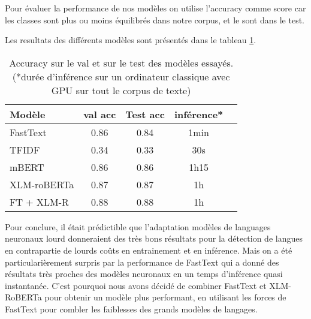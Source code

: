 
Pour évaluer la performance de nos modèles on utilise l'accuracy comme score car les classes sont plus ou moins équilibrés dans notre corpus, et le sont dans le test.

Les resultats des différents modèles sont présentés dans le tableau \ref{tab:results}.

\begin{table}[ht]
    \centering
    \begin{tabular}{lcccc}
        \toprule
        Modèle & val acc & Test acc  & inférence* \\
        \midrule
        FastText & 0.86 & 0.84 & 1min \\
        TFIDF & 0.34 & 0.33 & 30s \\
        mBERT & 0.86 & 0.86 & 1h15 \\
        XLM-roBERTa & 0.87 & 0.87 & 1h \\
        FT + XLM-R & 0.88 & 0.88 & 1h \\
        \bottomrule
    \end{tabular}

    \caption{Accuracy sur le val et sur le test des modèles essayés. (*durée d'inférence sur un ordinateur classique avec GPU sur tout le corpus de texte)}
    
    \label{tab:results}
\end{table}

Pour conclure, il était prédictible que l'adaptation modèles de languages neuronaux lourd donneraient des très bons résultats pour la détection de langues en contrapartie de lourds coûts en entrainement et en inférence. Mais on a été particularièrement surpris par la performance de FastText qui a donné des résultats très proches des modèles neuronaux en un temps d'inférence quasi instantanée. C'est pourquoi nous avons décidé de combiner FastText et XLM-RoBERTa pour obtenir un modèle plus performant, en utilisant les forces de FastText pour combler les faiblesses des grands modèles de langages.